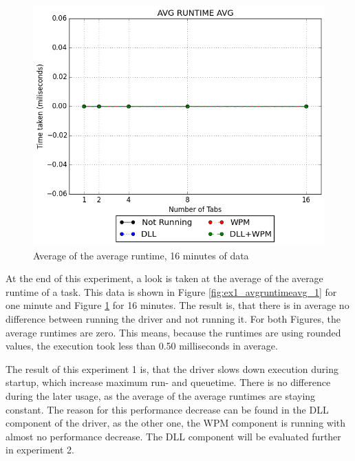 \begin{figure}[!htbp]
	\centering
    \includegraphics[width=\textwidth,keepaspectratio]{Evaluation/experiment1/AVG-RUNTIME-AVG-16.png}
    \caption{Average of the average runtime, 16 minutes of data}
    \label{fig:ex1_avgruntimeavg_16}
\end{figure}
At the end of this experiment, a look is taken at the average of the average runtime of a task. This data is shown in Figure \ref{fig:ex1_avgruntimeavg_1} for one minute and Figure \ref{fig:ex1_avgruntimeavg_16} for 16 minutes. The result is, that there is in average no difference between running the driver and not running it. For both Figures, the average runtimes are zero. This means, because the runtimes are using rounded values, the execution took less than 0.50 milliseconds in average.

\medskip

The result of this experiment 1 is, that the driver slows down execution during startup, which increase maximum run- and queuetime. There is no difference during the later usage, as the average of the average runtimes are staying constant. The reason for this performance decrease can be found in the \gls{DLL} component of the driver, as the other one, the \gls{WPM} component is running with almost no performance decrease. The \gls{DLL} component will be evaluated further in experiment 2.